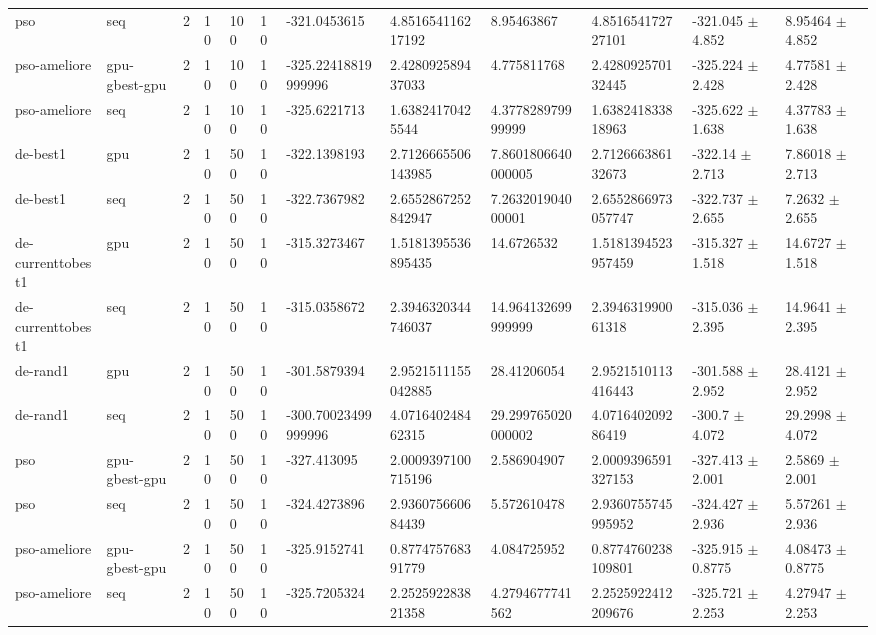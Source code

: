 \begin{table}[t]
\begin{tabular}{llllllllllll}
pso & seq & 2 & 10 & 100 & 10 & -321.0453615 & 4.851654116217192 & 8.95463867 & 4.851654172727101 & -321.045 $\pm$ 4.852 & 8.95464 $\pm$ 4.852 \\
pso-ameliore & gpu-gbest-gpu & 2 & 10 & 100 & 10 & -325.22418819999996 & 2.428092589437033 & 4.775811768 & 2.428092570132445 & -325.224 $\pm$ 2.428 & 4.77581 $\pm$ 2.428 \\
pso-ameliore & seq & 2 & 10 & 100 & 10 & -325.6221713 & 1.63824170425544 & 4.377828979999999 & 1.638241833818963 & -325.622 $\pm$ 1.638 & 4.37783 $\pm$ 1.638 \\
de-best1 & gpu & 2 & 10 & 500 & 10 & -322.1398193 & 2.7126665506143985 & 7.8601806640000005 & 2.712666386132673 & -322.14 $\pm$ 2.713 & 7.86018 $\pm$ 2.713 \\
de-best1 & seq & 2 & 10 & 500 & 10 & -322.7367982 & 2.6552867252842947 & 7.263201904000001 & 2.6552866973057747 & -322.737 $\pm$ 2.655 & 7.2632 $\pm$ 2.655 \\
de-currenttobest1 & gpu & 2 & 10 & 500 & 10 & -315.3273467 & 1.5181395536895435 & 14.6726532 & 1.5181394523957459 & -315.327 $\pm$ 1.518 & 14.6727 $\pm$ 1.518 \\
de-currenttobest1 & seq & 2 & 10 & 500 & 10 & -315.0358672 & 2.3946320344746037 & 14.964132699999999 & 2.394631990061318 & -315.036 $\pm$ 2.395 & 14.9641 $\pm$ 2.395 \\
de-rand1 & gpu & 2 & 10 & 500 & 10 & -301.5879394 & 2.9521511155042885 & 28.41206054 & 2.9521510113416443 & -301.588 $\pm$ 2.952 & 28.4121 $\pm$ 2.952 \\
de-rand1 & seq & 2 & 10 & 500 & 10 & -300.70023499999996 & 4.071640248462315 & 29.299765020000002 & 4.071640209286419 & -300.7 $\pm$ 4.072 & 29.2998 $\pm$ 4.072 \\
pso & gpu-gbest-gpu & 2 & 10 & 500 & 10 & -327.413095 & 2.0009397100715196 & 2.586904907 & 2.0009396591327153 & -327.413 $\pm$ 2.001 & 2.5869 $\pm$ 2.001 \\
pso & seq & 2 & 10 & 500 & 10 & -324.4273896 & 2.936075660684439 & 5.572610478 & 2.9360755745995952 & -324.427 $\pm$ 2.936 & 5.57261 $\pm$ 2.936 \\
pso-ameliore & gpu-gbest-gpu & 2 & 10 & 500 & 10 & -325.9152741 & 0.877475768391779 & 4.084725952 & 0.8774760238109801 & -325.915 $\pm$ 0.8775 & 4.08473 $\pm$ 0.8775 \\
pso-ameliore & seq & 2 & 10 & 500 & 10 & -325.7205324 & 2.252592283821358 & 4.2794677741562 & 2.2525922412209676 & -325.721 $\pm$ 2.253 & 4.27947 $\pm$ 2.253 \\

\end{tabular}
\end{table}
